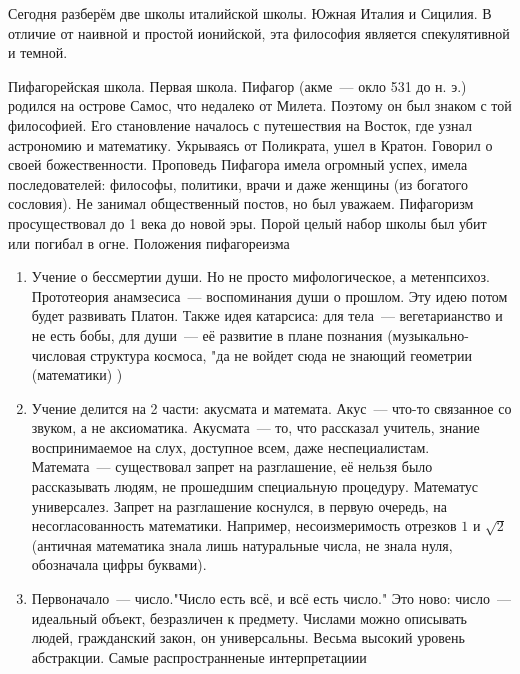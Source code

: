 Сегодня разберём две школы италийской школы. Южная Италия и Сицилия. 
В отличие от наивной и простой ионийской, эта философия является спекулятивной и темной. 

Пифагорейская школа. 
Первая школа. 
Пифагор (акме~--- окло 531 до н. э.) родился на острове Самос, что недалеко от Милета. Поэтому он был знаком с той философией. 
Его становление началось с путешествия на Восток, где узнал астрономию и математику. Укрываясь от Поликрата, ушел в Кратон. Говорил о своей божественности. 
Проповедь Пифагора имела огромный успех, имела последователей: философы, политики, врачи и даже женщины (из богатого сословия). Не занимал общественный постов, но был уважаем. 
Пифагоризм просуществовал до 1 века до новой эры. Порой целый набор школы был убит или погибал в огне. 
Положения пифагореизма

\begin{enumerate}
	\item Учение о бессмертии души. Но не просто мифологическое, а метенпсихоз. Прототеория анамзесиса~--- воспоминания души о прошлом. Эту идею потом будет развивать Платон. 
	Также идея катарсиса: для тела~--- вегетарианство и не есть бобы, для души~--- её развитие в плане познания (музыкально-числовая структура космоса, "да не войдет сюда не знающий геометрии (математики) ) 
	\item Учение делится на 2 части: акусмата и математа. Акус~--- что-то связанное со звуком, а не аксиоматика. Акусмата~--- то, что рассказал учитель, знание воспринимаемое на слух, доступное всем, даже неспециалистам. Математа~--- существовал запрет на разглашение, её нельзя было рассказывать людям, не прошедшим специальную процедуру. 
	Математус универсалез. Запрет на разглашение коснулся, в первую очередь, на несогласованность математики. 
	Например, несоизмеримость отрезков $1$ и $\sqrt{2}$ (античная математика знала лишь натуральные числа, не знала нуля, обозначала цифры буквами). 
	\item Первоначало~--- число."Число есть всё, и всё есть число." Это ново: число~--- идеальный объект, безразличен к предмету. 
	Числами можно описывать людей, гражданский закон, он универсальны. Весьма высокий уровень абстракции. Самые распространненые интерпретациии
\end{enumerate}

